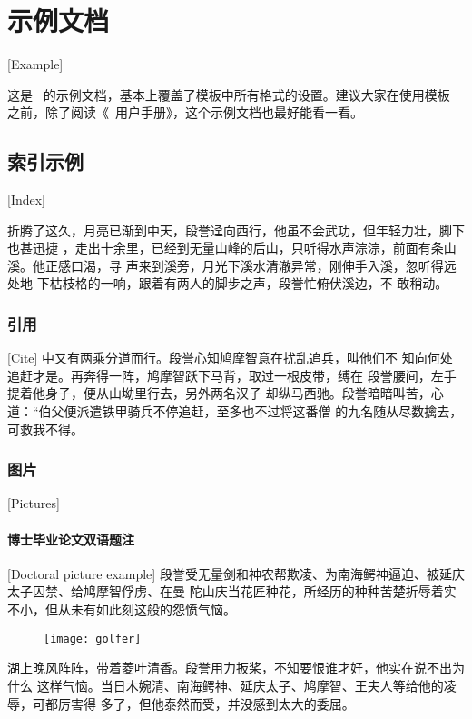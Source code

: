 
\chapter{示例文档}[Example]

这是 \hithesis\ 的示例文档，基本上覆盖了模板中所有格式的设置。建议大家在使用模板
之前，除了阅读《\hithesis\ 用户手册》，这个示例文档也最好能看一看。

\section{索引示例}[Index]

折腾了这久，月亮已渐到中天，段誉迳向西行，他虽不会武功，但年轻力壮，脚下也甚迅捷
，走出十余里，已经到无量山峰的后山，只听得水声淙淙，前面有条山溪。他正感口渴，寻
声来到溪旁，月光下溪水清澈异常，刚伸手入溪，忽听得远处地
下枯枝格的一响，跟着有两人的脚步之声，段誉忙俯伏溪边，不
敢稍动。

\subsection{引用}[Cite]
中又有两乘分道而行。段誉心知鸠摩智意在扰乱追兵，叫他们不
知向何处追赶才是\cite{cnproceed}。再奔得一阵，鸠摩智跃下马背，取过一根皮带，缚在
段誉腰间，左手提着他身子，便从山坳里行去，另外两名汉子
却纵马西驰。段誉暗暗叫苦，心道：“伯父便派遣铁甲骑兵不停追赶，至多也不过将这番僧
的九名随从尽数擒去，可救我不得\cite{cnarticle}。

\subsection{图片}[Pictures]
\subsubsection{博士毕业论文双语题注}[Doctoral picture example]
段誉受无量剑和神农帮欺凌、为南海鳄神逼迫、被延庆太子囚禁、给鸠摩智俘虏、在曼
陀山庆当花匠种花，所经历的种种苦楚折辱着实不小，但从未有如此刻这般的怨愤气恼。
\begin{figure}[htpb]
\centering
\texttt{[image: golfer]}
\end{figure}
湖上晚风阵阵，带着菱叶清香。段誉用力扳桨，不知要恨谁才好，他实在说不出为什么
这样气恼。当日木婉清、南海鳄神、延庆太子、鸠摩智、王夫人等给他的凌辱，可都厉害得
多了，但他泰然而受，并没感到太大的委屈。

